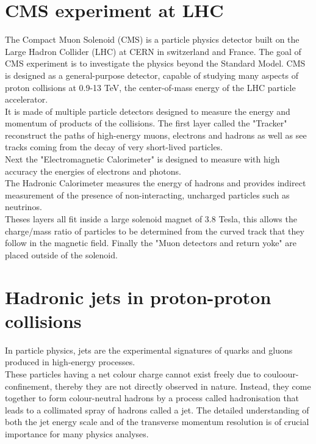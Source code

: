 \label{chap:premierchapitre}

\section{CMS experiment at LHC}

The Compact Muon Solenoid (CMS) is a particle physics detector built on the Large Hadron Collider
(LHC) at CERN in switzerland and France. The goal of CMS experiment is to investigate the physics beyond the Standard
Model.
CMS is designed as a general-purpose detector, capable of studying many aspects of proton collisions at 0.9-13 TeV, the
center-of-mass energy of the LHC particle accelerator.\\
It is made of multiple particle detectors designed to measure the energy and momentum of products of the collisions.
The first layer called the "Tracker" reconstruct the paths of high-energy muons, electrons and hadrons as well as see
tracks coming from the decay of very short-lived particles.\\
Next the "Electromagnetic Calorimeter" is designed to measure with high accuracy the energies of electrons and
photons.\\
The Hadronic Calorimeter measures the energy of hadrons and provides indirect measurement of the presence of
non-interacting, uncharged particles such as neutrinos.\\
Theses layers all fit inside a large solenoid magnet of 3.8 Tesla, this allows the charge/mass ratio of particles to be
determined from the curved track that they follow in the magnetic field.
Finally the "Muon detectors and return yoke" are placed outside of the solenoid.

\section{Hadronic jets in proton-proton collisions}

In particle physics, jets are the experimental signatures of quarks and gluons produced in high-energy processes.\\
These particles having a net colour charge cannot exist freely due to couloour-confinement, thereby they are not
directly observed in nature. Instead, they come together to form colour-neutral hadrons by a process called
hadronisation that leads to a collimated spray of hadrons called a jet.
The detailed understanding of both the jet energy scale and of the transverse momentum resolution is of crucial
importance for many physics analyses.

